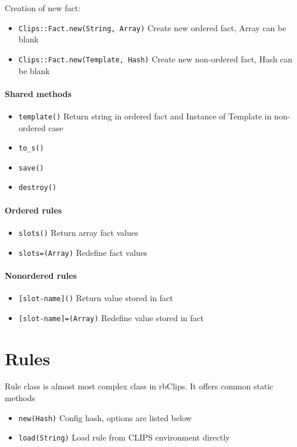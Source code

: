 \documentclass[a4paper,10pt]{article}
\begin{document}
Creation of new fact:
\begin{itemize}
 \item \texttt{Clips::Fact.new(String, Array)} Create new ordered fact, Array can be blank
 \item \texttt{Clips::Fact.new(Template, Hash)} Create new non-ordered fact, Hash can be blank
\end{itemize}

\paragraph{Shared methods}
\begin{itemize}
 \item \texttt{template()} Return string in ordered fact and Instance of Template in non-ordered case
 \item \texttt{to\_s()}
 \item \texttt{save()}
 \item \texttt{destroy()}
\end{itemize}

\paragraph{Ordered rules}
\begin{itemize}
 \item \texttt{slots()} Return array fact values
 \item \texttt{slots=(Array)} Redefine fact values
\end{itemize}
\paragraph{Nonordered rules}
\begin{itemize}
 \item \texttt{[slot-name]()} Return value stored in fact
 \item \texttt{[slot-name]=(Array)} Redefine value stored in fact
\end{itemize}

\section{Rules}
Rule class is almost most complex class in rbClips. It offers common static methods
\begin{itemize}
 \item \texttt{new(Hash)} Config hash, options are listed below
 \item \texttt{load(String)} Load rule from CLIPS environment directly
\end{itemize}
\end{document}
